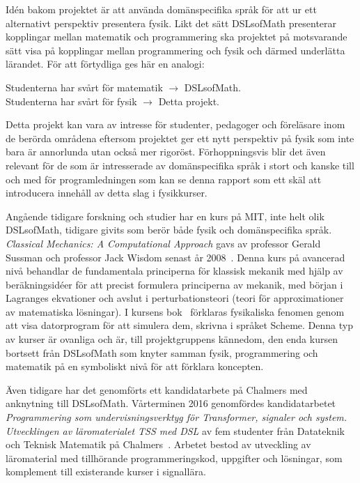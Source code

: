 Idén bakom projektet är att använda domänspecifika språk för att ur ett alternativt perspektiv presentera fysik. Likt det sätt DSLsofMath
presenterar kopplingar mellan matematik och programmering ska projektet på motsvarande sätt visa på kopplingar mellan programmering och fysik och därmed
underlätta lärandet. För att förtydliga ges här en analogi:


\begin{center}
Studenterna har svårt för matematik $\rightarrow $ DSLsofMath.\\
Studenterna har svårt för fysik $\rightarrow $ Detta projekt.
\end{center}

Detta projekt kan vara av intresse för studenter, pedagoger och
föreläsare inom de berörda områdena eftersom projektet ger ett nytt
perspektiv på fysik som inte bara är annorlunda utan också mer rigoröst.
Förhoppningsvis blir det även relevant för de som är intresserade av
domänspecifika språk i stort och kanske till och med för programledningen som
kan se denna rapport som ett skäl att introducera innehåll av detta slag i
fysikkurser.

Angående tidigare forskning och studier har en kurs på MIT, inte helt olik
DSLsofMath, tidigare givits som berör både fysik och
domänspecifika språk.
\textit{Classical Mechanics: A Computational Approach} gavs av professor Gerald Sussman
och professor Jack Wisdom senast år 2008~\cite{classical-mechanics-course-mit-2008}.
Denna kurs på avancerad nivå behandlar de fundamentala principerna för klassisk
mekanik med hjälp av beräkningsidéer för att precist formulera principerna av
mekanik, med början i Lagranges ekvationer och avslut i perturbationsteori
(teori för approximationer av matematiska lösningar). I kursens bok~\cite{SICM}
förklaras fysikaliska fenomen genom att visa datorprogram för att simulera dem,
skrivna i språket Scheme. Denna typ av kurser är ovanliga och är, till
projektgruppens kännedom, den enda kursen bortsett från DSLsofMath som knyter
samman fysik, programmering och matematik på en symboliskt nivå för att förklara
koncepten.

Även tidigare har det genomförts ett kandidatarbete på Chalmers med anknytning till DSLsofMath.
Vårterminen 2016 genomfördes kandidatarbetet \textit{Programmering som
undervisningsverktyg för Transformer, signaler och system. Utvecklingen av
läromaterialet TSS med DSL} av fem studenter från Datateknik och Teknisk
Matematik på Chalmers~\cite{kandidat2016}. Arbetet bestod av utveckling av läromaterial med
tillhörande programmeringskod, uppgifter och lösningar, som komplement till
existerande kurser i signallära.

